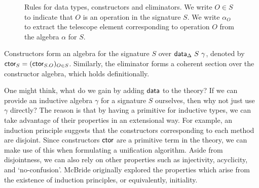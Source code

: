 \begin{figure}[H]
\caption{Rules for data types, constructors and eliminators. We write $O \in S$
to indicate that $O$ is an operation in the signature $S$. We write $\alpha_O$
to extract the telescope element corresponding to operation $O$ from the algebra
$\alpha$ for $S$.}
\label{fig:data-rules}
\end{figure}

Constructors form an algebra for the signature $S$ over
$\textsf{data}_\Delta\ S\ \gamma$, denoted by $\textsf{ctor}_S = (\textsf{ctor}_{S.O})_{O \in S}$.
Similarly, the eliminator forms a coherent section over the constructor algebra,
which holds definitionally.

One might think, what do we gain by adding $\textsf{data}$ to the theory? If we can
provide an inductive algebra $\gamma$ for a signature $S$ ourselves, then why
not just use $\gamma$ directly? The reason is that by having a primitive for
inductive types, we can take advantage of their properties in an extensional
way. For example, an induction principle suggests that the constructors
corresponding to each method are disjoint. Since constructors $\textsf{ctor}$ are a
primitive term in the theory, we can make use of this when formulating a
unification algorithm. Aside from disjointness, we can also rely on other
properties such as injectivity, acyclicity, and `no-confusion'. McBride
\cite{McBride2006-fp} originally explored the properties which arise from the
existence of induction principles, or equivalently, initiality.

